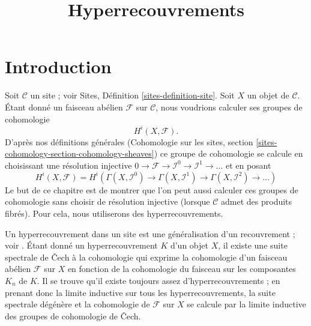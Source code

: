 

%


\title{Hyperrecouvrements}


\maketitle

\label{section-phantom}

\tableofcontents

\section{Introduction}
\label{section-introduction}

\noindent
Soit $\mathcal{C}$ un site ; voir Sites, Définition \ref{sites-definition-site}.
Soit $X$ un objet de $\mathcal{C}$.
Étant donné un faisceau abélien $\mathcal{F}$
sur $\mathcal{C}$, nous voudrions calculer
ses groupes de cohomologie
$$
H^i(X, \mathcal{F}).
$$
D'après nos définitions générales (Cohomologie sur les sites, section
\ref{sites-cohomology-section-cohomology-sheaves})
ce groupe de cohomologie se calcule en
choisissant une résolution injective
$
0 \to \mathcal{F} \to \mathcal{I}^0 \to \mathcal{I}^1 \to \ldots
$
et en posant
$$
H^i(X, \mathcal{F})
=
H^i(
\Gamma(X, \mathcal{I}^0) \to
\Gamma(X, \mathcal{I}^1) \to
\Gamma(X, \mathcal{I}^2)\to \ldots)
$$
Le but de ce chapitre est de montrer que l'on peut aussi calculer ces
groupes de cohomologie sans choisir de résolution injective
(lorsque $\mathcal{C}$ admet des produits fibrés). Pour cela,
nous utiliserons des hyperrecouvrements.

\medskip\noindent
Un hyperrecouvrement dans un site est une généralisation d'un recouvrement ; voir
\cite[Expos\'e V, Sec. 7]{SGA4}. Étant donné un hyperrecouvrement $K$ d'un objet
$X$, il existe une suite spectrale de {\v C}ech à la cohomologie
qui exprime la cohomologie d'un faisceau abélien $\mathcal{F}$
sur $X$ en fonction de la cohomologie du faisceau sur les
composantes $K_n$ de $K$. Il se trouve qu'il existe toujours
assez d'hyperrecouvrements ; en prenant donc la limite inductive sur tous les hyperrecouvrements,
la suite spectrale dégénère et la cohomologie de $\mathcal{F}$
sur $X$ se calcule par la limite inductive des groupes de cohomologie de {\v C}ech.

